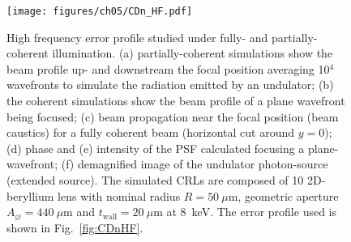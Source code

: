 \begin{refsection}
\begin{figure}[t]
        \centering
        {\texttt{[image: figures/ch05/CDn\_HF.pdf]}}
        \caption[High frequency errors studied under fully- and partially-coherent illuminations]{High frequency error profile studied under fully- and partially-coherent illumination. (a) partially-coherent simulations show the beam profile up- and downstream the focal position averaging 10$^{4}$ wavefronts to simulate the radiation emitted by an undulator; (b) the coherent simulations show the beam profile of a plane wavefront being focused; (c) beam propagation near the focal position (beam caustics) for a fully coherent beam (horizontal cut around $y=0$); (d) phase and (e) intensity of the PSF calculated focusing a plane-wavefront; (f) demagnified image of the undulator photon-source (extended source). The simulated CRLs are composed of 10 2D-beryllium lens with nominal radius $R=50~\mu\text{m}$, geometric aperture $A_{\diameter}=440~\mu\text{m}$ and $t_\text{wall}=20~\mu$m at 8~keV. The error profile used is shown in Fig.~\ref{fig:CDnHF}.}\label{fig:simulations_HF}
\end{figure}


\end{refsection}

